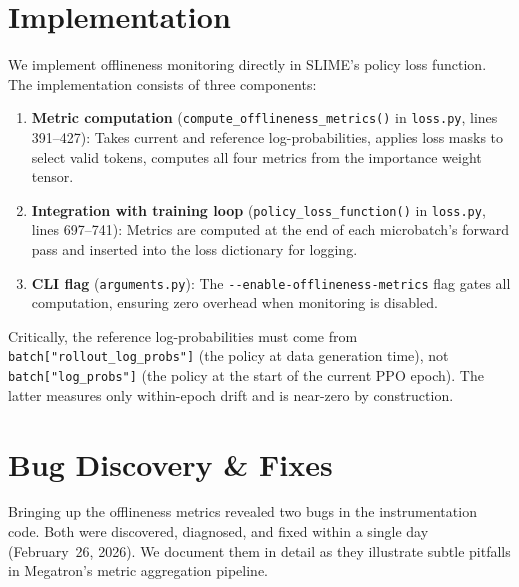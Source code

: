 \documentclass[11pt,a4paper]{article}
\begin{document}
\section{Implementation}
\label{sec:implementation}

We implement offlineness monitoring directly in SLIME's policy loss function.
The implementation consists of three components:

\begin{enumerate}[leftmargin=*]
  \item \textbf{Metric computation} (\texttt{compute\_offlineness\_metrics()} in
        \texttt{loss.py}, lines 391--427): Takes current and reference
        log-probabilities, applies loss masks to select valid tokens, computes
        all four metrics from the importance weight tensor.

  \item \textbf{Integration with training loop} (\texttt{policy\_loss\_function()}
        in \texttt{loss.py}, lines 697--741): Metrics are computed at the end of
        each microbatch's forward pass and inserted into the loss dictionary for
        logging.

  \item \textbf{CLI flag} (\texttt{arguments.py}): The
        \texttt{-{}-enable-offlineness-metrics} flag gates all computation,
        ensuring zero overhead when monitoring is disabled.
\end{enumerate}

Critically, the reference log-probabilities must come from
\texttt{batch["rollout\_log\_probs"]} (the policy at data generation time), not
\texttt{batch["log\_probs"]} (the policy at the start of the current PPO epoch).
The latter measures only within-epoch drift and is near-zero by construction.


\section{Bug Discovery \& Fixes}
\label{sec:bugs}

Bringing up the offlineness metrics revealed two bugs in the instrumentation
code. Both were discovered, diagnosed, and fixed within a single day
(February~26, 2026). We document them in detail as they illustrate subtle
pitfalls in Megatron's metric aggregation pipeline.
\end{document}
